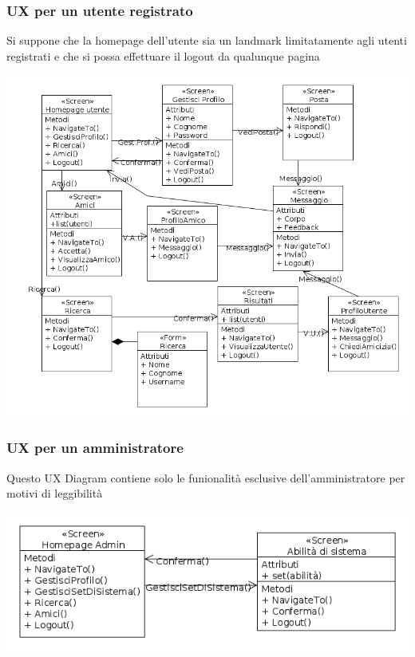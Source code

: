 \subsubsection{UX per un utente registrato}
Si suppone che la homepage dell'utente sia un landmark limitatamente agli utenti registrati e che si possa effettuare il logout da qualunque pagina
\begin{center}
 \includegraphics[width=1\columnwidth]{uxutente.png}
\end{center}
\pagebreak
\subsubsection{UX per un amministratore}
Questo UX Diagram contiene solo le funionalità esclusive dell'amministratore per motivi di leggibilità
\begin{center}
 \includegraphics[width=1\columnwidth]{uxadmin.png}
\end{center}